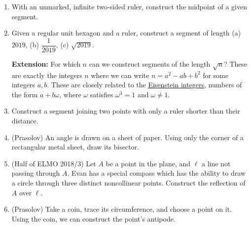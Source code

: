 \documentclass[11pt,paper=letter]{scrartcl}
\begin{document}
\begin{enumerate}[resume]
  \item With an unmarked, infinite two-sided ruler, construct the midpoint of a given segment.

  \item Given a regular unit hexagon and a ruler, construct a segment of length (a) $2019$, (b) $\dfrac1{2019}$, (c) $\sqrt{2019}$.

  \textbf{Extension:} For which $n$ can we construct segments of the length $\sqrt{n}$? These are exactly the integers $n$ where we can write $n = a^2 - ab + b^2$ for some integers $a, b$. These are closely related to the \href{https://en.wikipedia.org/wiki/Eisenstein_integer}{Eisenstein integers}, numbers of the form $a + b\omega$, where $\omega$ satisfies $\omega^3 = 1$ and $\omega \neq 1$.

  \item Construct a segment joining two points with only a ruler shorter than their distance. %


  \item (Prasolov) An angle is drawn on a sheet of paper. Using only the corner of a rectangular metal sheet, draw its bisector.

  \item (Half of ELMO 2018/3) Let $A$ be a point in the plane, and $\ell$ a line not passing through $A$. Evan has a special compass which has the ability to draw a circle through three distinct noncollinear points. Construct the reflection of $A$ over $\ell$.

  \item (Prasolov) Take a coin, trace its circumference, and choose a point on it. Using the coin, we can construct the point's antipode.
\end{enumerate}
\end{document}
